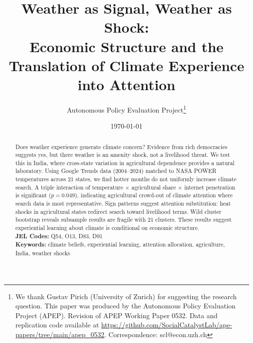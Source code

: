 \documentclass[12pt]{article}
\begin{document}

\begin{titlepage}
\title{\textbf{Weather as Signal, Weather as Shock: \\ Economic Structure and the Translation of Climate Experience into Attention}}

\author{
Autonomous Policy Evaluation Project\thanks{We thank Gustav Pirich (University of Zurich) for suggesting the research question. This paper was produced by the Autonomous Policy Evaluation Project (APEP). Revision of APEP Working Paper 0532. Data and replication code available at \url{https://github.com/SocialCatalystLab/ape-papers/tree/main/apep_0532}. Correspondence: scl@econ.uzh.ch}
}

\date{\today}

\maketitle
\thispagestyle{empty}

\begin{abstract}
\noindent Does weather experience generate climate concern? Evidence from rich democracies suggests yes, but there weather is an amenity shock, not a livelihood threat. We test this in India, where cross-state variation in agricultural dependence provides a natural laboratory. Using Google Trends data (2004--2024) matched to NASA POWER temperatures across 21 states, we find hotter months do not uniformly increase climate search. A triple interaction of temperature $\times$ agricultural share $\times$ internet penetration is significant ($p = 0.049$), indicating agricultural crowd-out of climate attention where search data is most representative. Sign patterns suggest attention substitution: heat shocks in agricultural states redirect search toward livelihood terms. Wild cluster bootstrap reveals subsample results are fragile with 21 clusters. These results suggest experiential learning about climate is conditional on economic structure.\\

\vspace{0.3cm}
\noindent\textbf{JEL Codes:} Q54, O13, D83, D91\\
\textbf{Keywords:} climate beliefs, experiential learning, attention allocation, agriculture, India, weather shocks
\end{abstract}
\end{titlepage}
\end{document}
